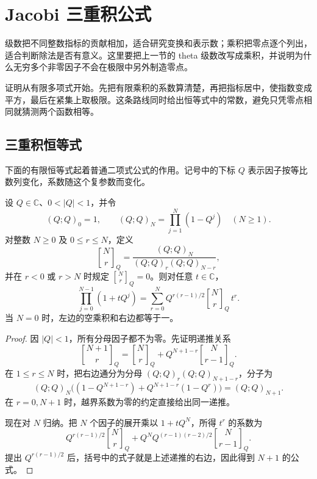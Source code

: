 \section{Jacobi 三重积公式}
\label{b3:sec:2402}

级数把不同整数指标的贡献相加，适合研究变换和表示数；乘积把零点逐个列出，适合判断除法是否有意义。这里要把上一节的 theta 级数改写成乘积，并说明为什么无穷多个非零因子不会在极限中另外制造零点。

证明从有限多项式开始。先把有限乘积的系数算清楚，再把指标居中，使指数变成平方，最后在紧集上取极限。这条路线同时给出恒等式中的常数，避免只凭零点相同就猜测两个函数相等。

\subsection{三重积恒等式}
\label{b3:subsec:240201}

下面的有限恒等式起着普通二项式公式的作用。记号中的下标 \(Q\) 表示因子按等比数列变化，系数随这个复参数而变化。

\begin{lemma}[有限二项式恒等式]\label{b3:lem:24-finite-binomial}
设 \(Q\in\mathbb C\)、\(0<|Q|<1\)，并令
\[
 (Q;Q)_0=1,\qquad (Q;Q)_N=\prod_{j=1}^N(1-Q^j)
 \quad(N\ge1).
\]
对整数 \(N\ge0\) 及 \(0\le r\le N\)，定义
\[
 {N\brack r}_Q
 =\frac{(Q;Q)_N}{(Q;Q)_r(Q;Q)_{N-r}},
\]
并在 \(r<0\) 或 \(r>N\) 时规定 \({N\brack r}_Q=0\)。则对任意 \(t\in\mathbb C\)，
\begin{equation}\label{b3:eq:24-finite-binomial}
 \prod_{j=0}^{N-1}(1+tQ^j)
 =\sum_{r=0}^N Q^{r(r-1)/2}{N\brack r}_Q\,t^r.
\end{equation}
当 \(N=0\) 时，左边的空乘积和右边都等于一。
\end{lemma}
\begin{proof}
因 \(|Q|<1\)，所有分母因子都不为零。先证明递推关系
\[
 {N+1\brack r}_Q
 ={N\brack r}_Q+Q^{N+1-r}{N\brack r-1}_Q.
\]
在 \(1\le r\le N\) 时，把右边通分为分母
\((Q;Q)_r(Q;Q)_{N+1-r}\)，分子为
\[
 (Q;Q)_N\bigl((1-Q^{N+1-r})
              +Q^{N+1-r}(1-Q^r)\bigr)
 =(Q;Q)_{N+1}.
\]
在 \(r=0,N+1\) 时，越界系数为零的约定直接给出同一递推。

现在对 \(N\) 归纳。把 \(N\) 个因子的展开乘以 \(1+tQ^N\)，所得 \(t^r\) 的系数为
\[
 Q^{r(r-1)/2}{N\brack r}_Q
 +Q^N Q^{(r-1)(r-2)/2}{N\brack r-1}_Q.
\]
提出 \(Q^{r(r-1)/2}\) 后，括号中的式子就是上述递推的右边，因此得到 \(N+1\) 的公式。
\end{proof}

